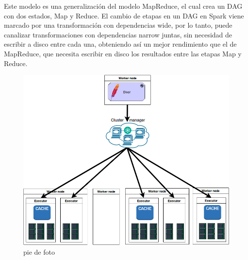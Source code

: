Este modelo es una generalización del modelo MapReduce, el cual crea un DAG con dos estados, Map y Reduce. El cambio de etapas en un DAG en Spark viene marcado por una transformación con dependencias wide, por lo tanto, puede canalizar transformaciones con dependencias narrow juntas, sin necesidad de escribir a disco entre cada una, obteniendo así un mejor rendimiento que el de MapReduce, que necesita escribir en disco los resultados entre las etapas Map y Reduce.\\

\begin{figure}[H]
	\includegraphics[scale=0.6]{img/arquitectura}
	\centering
	\caption{pie de foto}
	\label{foto}
\end{figure}
